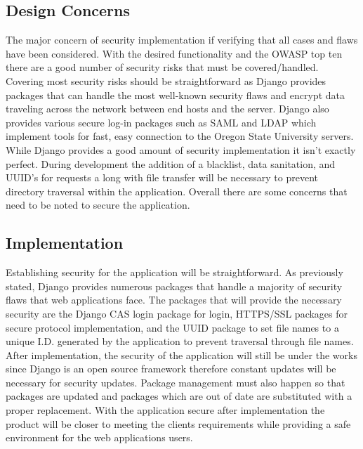 \documentclass[onecolumn, draftclsnofoot,10pt, compsoc]{IEEEtran}
\begin{document}
\subsection{Design Concerns}
The major concern of security implementation if verifying that all cases and flaws have been considered. With the desired functionality and the OWASP top ten there are a good number of security risks that must be covered/handled. Covering most security risks should be straightforward as Django provides packages that can handle the most well-known security flaws and encrypt data traveling across the network between end hosts and the server. Django also provides various secure log-in packages such as SAML and LDAP which implement tools for fast, easy connection to the Oregon State University servers. While Django provides a good amount of security implementation it isn’t exactly perfect. During development the addition of a blacklist, data sanitation, and UUID's for requests a long with file transfer will be necessary to prevent directory traversal within the application. Overall there are some concerns that need to be noted to secure the application. 

\subsection{Implementation}
Establishing security for the application will be straightforward. As previously stated, Django provides numerous packages that handle a majority of security flaws that web applications face. The packages that will provide the necessary security are the Django CAS login package for login, HTTPS/SSL packages for secure protocol implementation, and the UUID package to set file names to a unique I.D. generated by the application to prevent traversal through file names. After implementation, the security of the application will still be under the works since Django is an open source framework therefore constant updates will be necessary for security updates. Package management must also happen so that packages are updated and packages which are out of date are substituted with a proper replacement. With the application secure after implementation the product will be closer to meeting the clients requirements while providing a safe environment for the web applications users.  
\end{document}
